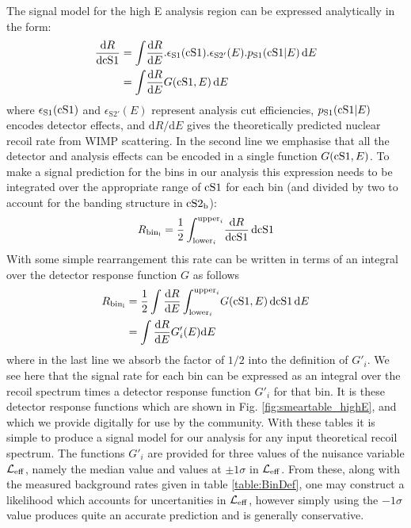 The signal model for the high E analysis region can be expressed analytically in the form:
%
\begin{align}
\label{eq:high2D}
  \frac{\mathrm{d} R}{\mathrm{d}\mathrm{cS1}} &= \int \! \frac{\mathrm{d}R}{\mathrm{d}E}.\epsilon_\mathrm{S1}(\mathrm{cS1}) .\epsilon_\mathrm{S2'}(E).p_\mathrm{S1}(\mathrm{\mathrm{cS1}}|E) \, \mathrm{d}E \\
  &= \int \! \frac{\mathrm{d}R}{\mathrm{d}E} G(\mathrm{cS1},E) \, \mathrm{d}E
\end{align}
%
where $\epsilon_\mathrm{S1}(\mathrm{cS1})$ and $\epsilon_\mathrm{S2'}(E)$ represent analysis cut efficiencies, $p_\mathrm{S1}(\mathrm{\mathrm{cS1}}|E)$ encodes detector effects, and $\mathrm{d}R/\mathrm{d}E$ gives the theoretically predicted nuclear recoil rate from WIMP scattering. In the second line we emphasise that all the detector and analysis effects can be encoded in a single function $G(\mathrm{cS1},E)$. To make a signal prediction for the bins in our analysis this expression needs to be integrated over the appropriate range of $\mathrm{cS1}$ for each bin (and divided by two to account for the banding structure in $\mathrm{cS2}_\mathrm{b}$):
%
\begin{equation}
  R_\mathrm{bin_i} = \frac{1}{2}\int_{\mathrm{lower}_i}^{\mathrm{upper}_i} \! \frac{\mathrm{d} R}{\mathrm{d}\mathrm{cS1}} \, \mathrm{d}\mathrm{cS1}
\end{equation}
%
With some simple rearrangement this rate can be written in terms of an integral over the detector response function $G$ as follows
%
\begin{align}
  R_\mathrm{bin_i} &= \frac{1}{2}\int\frac{\mathrm{d} R}{\mathrm{d}E}\int_{\mathrm{lower}_i}^{\mathrm{upper}_i} \! G(\mathrm{cS1},E) \, \mathrm{d}\mathrm{cS1} \, \mathrm{d}E \\
 &= \int\frac{\mathrm{d} R}{\mathrm{d}E} G'_i(E) \mathrm{d}E
\end{align}
%
where in the last line we absorb the factor of $1/2$ into the definition of $G'_i$. We see here that the signal rate for each bin can be expressed as an integral over the recoil spectrum times a detector response function $G'_i$ for that bin. It is these detector response functions which are shown in Fig. \ref{fig:smeartable_highE}, and which we provide digitally for use by the community. With these tables it is simple to produce a signal model for our analysis for any input theoretical recoil spectrum. The functions $G'_i$ are provided for three values of the nuisance variable $\mathcal{L}_{\mathrm{eff}}$, namely the median value and values at $\pm 1 \sigma$ in $\mathcal{L}_{\mathrm{eff}}$. From these, along with the measured background rates given in table \ref{table:BinDef}, one may construct a likelihood which accounts for uncertanities in $\mathcal{L}_{\mathrm{eff}}$, however simply using the $-1\sigma$ value produces quite an accurate prediction and is generally conservative.

